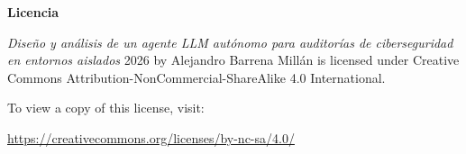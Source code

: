 \documentclass[hidelinks, headlogo, framedcover]{tfeEPCC}
\begin{document}

\cleardoublepage
\pagebreak
\pagestyle{empty}
\makebibliography

\cleardoublepage
\thispagestyle{empty}
\vspace*{\fill}
\begin{center}
    {\Large \textbf{Licencia}}
    
    \vspace{1.5cm}
    
    \begin{minipage}{0.85\textwidth}
        \centering
        \textit{Diseño y análisis de un agente LLM autónomo para auditorías de ciberseguridad en entornos aislados} \textcopyright{} 2026 by Alejandro Barrena Millán is licensed under Creative Commons Attribution-NonCommercial-ShareAlike 4.0 International.
        
        \vspace{1cm}
        
        To view a copy of this license, visit:
        
        \vspace{0.3cm}
        
        \url{https://creativecommons.org/licenses/by-nc-sa/4.0/}
    \end{minipage}
\end{center}
\vspace*{\fill}
\end{document}
